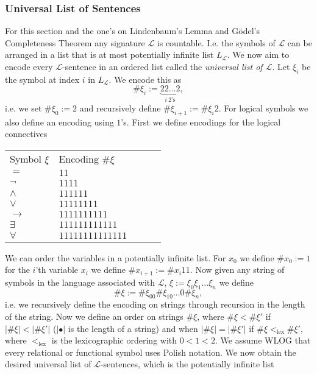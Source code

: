 \subsubsection{Universal List of Sentences}
For this section and the one's on Lindenbaum's Lemma and Gödel's Completeness Theorem any signature $\mathcal{L}$ is countable. I.e. the symbols of $\mathcal{L}$ can be arranged in a list that is at most potentially infinite list $L_\mathcal{L}$. We now aim to encode every $\mathcal{L}$-sentence in an ordered list called the \emph{universal list of $\mathcal{L}$}. Let $\xi_i$ be the symbol at index $i$ in $L_\mathcal{L}$. We encode this as
$$\#\xi_i := \underbrace{22\dots2}_{i\ 2\text{'s}},$$
i.e. we set $\#\xi_0:=2$ and recursively define $\#\xi_{i+1} := \#\xi_i 2$. For logical symbols we also define an encoding using $1$'s. First we define encodings for the logical connectives
\begin{table}[h]
\center
\begin{tabular}{lllll}
Symbol $\xi$    & Encoding $\#\xi$         &  &  &  \\
$=$       & $11$             &  &  &  \\
$\neg$    & $1111$           &  &  &  \\
$\wedge$  & $111111$         &  &  &  \\
$\vee$    & $11111111$       &  &  &  \\
$\to$     & $1111111111$     &  &  &  \\
$\exists$ & $111111111111$   &  &  &  \\
$\forall$ & $11111111111111$ &  &  & 
\end{tabular}
\end{table}
We can order the variables in a potentially infinite list. For $x_0$ we define $\#x_0:= 1$ for the $i$'th variable $x_i$ we define $\#x_{i+1}:= \#x_i11$. Now given any string of symbols in the language associated with $\mathcal{L}$, $\xi := \xi_0\xi_1\dots\xi_n$ we define 
$$\#\xi:= \#\xi_00\#\xi_10\dots 0\#\xi_n,$$
i.e. we recursively define the encoding on strings through recursion in the length of the string. Now we define an order on strings $\#\xi$, where $\#\xi<\#\xi'$ if $\vert \#\xi\vert < \vert \#\xi'\vert$ ($\vert\bullet\vert$ is the length of a string) and when $\vert \#\xi\vert =\vert \#\xi'\vert$ if $\#\xi <_{\mathrm{lex}} \#\xi'$, where $<_{\mathrm{lex}}$ is the lexicographic ordering with $0<1<2$. We assume WLOG that every relational or functional symbol uses Polish notation. We now obtain the desired universal list of $\mathcal{L}$-sentences, which is the potentially infinite list 
